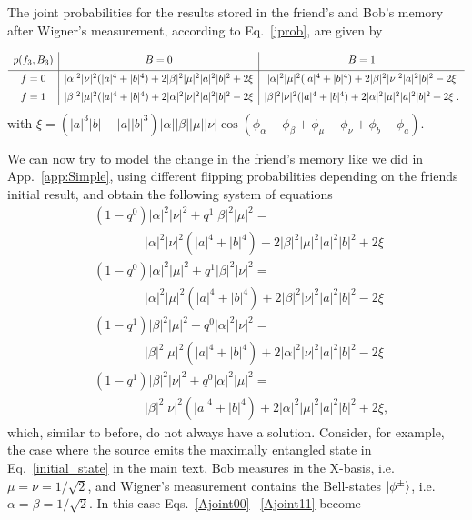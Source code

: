 \documentclass[a4paper,twocolumn,11pt,accepted=2017-05-09,dvipsnames]{quantumarticle}
\numberwithin{equation}{section}
\begin{document}
\begin{appendix}
The joint probabilities for the results stored in the friend's and Bob's memory after Wigner's measurement, according to Eq.~\eqref{jprob}, are given by
\begin{widetext}
\begin{equation*}
\renewcommand{\arraystretch}{1.25}
  \begin{array}{c|c| c}
  p(f_3,B_3)  & B=0  & B=1\\  [0.25em]  \hline
  f= 0 & |\alpha|^2 |\nu|^2 (|a|^4+|b|^4)+ 2 |\beta|^2 |\mu|^2|a|^2|b|^2 +2\xi  
   &  |\alpha|^2 |\mu|^2 (|a|^4+|b|^4)+ 2 |\beta|^2 |\nu|^2|a|^2|b|^2 - 2\xi  \\[0.25em]
   f= 1 &  |\beta|^2 |\mu|^2 (|a|^4+|b|^4)+2 |\alpha|^2 |\nu|^2|a|^2|b|^2 - 2\xi 
   &  |\beta|^2 |\nu|^2 (|a|^4+|b|^4)+ 2 |\alpha|^2 |\mu|^2|a|^2|b|^2 +2\xi \;.
  \end{array}
\end{equation*}
\centering with  $\xi=(|a|^3|b|-|a||b|^3)|\alpha||\beta||\mu||\nu| \cos (\phi_{\alpha}-\phi_{\beta}+\phi_{\mu}-\phi_{\nu}+\phi_b-\phi_a).$ 
\end{widetext}
We can now try to model the change in the friend's memory like we did in App.~\ref{app:Simple}, using different flipping probabilities depending on the friends initial result, and obtain the following system of equations\\
\begin{align}
\label{Ajoint00}
&(1-q^0)|\alpha|^2 |\nu|^2+q^1|\beta|^2|\mu|^2= \\
	&\qquad \qquad |\alpha|^2 |\nu|^2 (|a|^4+|b|^4)+ 2 |\beta|^2 |\mu|^2|a|^2|b|^2 +2\xi\nonumber \\
\label{Ajoint01}
&(1-q^0)|\alpha|^2 |\mu|^2+q^1|\beta|^2|\nu|^2= \\
 	&\qquad \qquad |\alpha|^2 |\mu|^2 (|a|^4+|b|^4)+ 2 |\beta|^2 |\nu|^2|a|^2|b|^2 - 2\xi \nonumber \\
 \label{Ajoint10}
&(1-q^1)|\beta|^2|\mu|^2 +q^0|\alpha|^2 |\nu|^2 =\\
	&\qquad \qquad |\beta|^2 |\mu|^2 (|a|^4+|b|^4)+2 |\alpha|^2 |\nu|^2|a|^2|b|^2 - 2\xi \nonumber \\
\label{Ajoint11}
 &(1-q^1)|\beta|^2|\nu|^2+q^0|\alpha|^2 |\mu|^2 =\\
 	& \qquad \qquad |\beta|^2 |\nu|^2 (|a|^4+|b|^4)+ 2 |\alpha|^2 |\mu|^2|a|^2|b|^2 +2\xi,\nonumber   
\end{align}
which, similar to before, do not  always have a solution. Consider, for example, the case where the source emits the maximally entangled state in Eq.~\eqref{initial_state} in the main text, Bob measures in the X-basis, i.e. $\mu= \nu =1/\sqrt{2}$, and Wigner's measurement contains the Bell-states $\ket{\phi^{\pm}}$, i.e. $\alpha=\beta=1/\sqrt{2}$. In this case Eqs.~\eqref{Ajoint00}-~\eqref{Ajoint11} become

\end{appendix}
\end{document}
